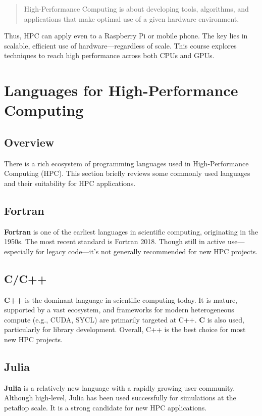 \documentclass[11pt,a4paper]{book}
\begin{document}
\begin{quotation}
High-Performance Computing is about developing tools, algorithms, and applications that make optimal use of a given hardware environment.
\end{quotation}

Thus, HPC can apply even to a Raspberry Pi or mobile phone. The key lies in scalable, efficient use of hardware—regardless of scale. This course explores techniques to reach high performance across both CPUs and GPUs.

\chapter{Languages for High-Performance Computing}

\section*{Overview}
There is a rich ecosystem of programming languages used in High-Performance Computing (HPC). This section briefly reviews some commonly used languages and their suitability for HPC applications.

\section{Fortran}
\textbf{Fortran} is one of the earliest languages in scientific computing, originating in the 1950s. The most recent standard is Fortran 2018. Though still in active use—especially for legacy code—it's not generally recommended for new HPC projects.

\section{C/C++}
\textbf{C++} is the dominant language in scientific computing today. It is mature, supported by a vast ecosystem, and frameworks for modern heterogeneous compute (e.g., CUDA, SYCL) are primarily targeted at C++. \textbf{C} is also used, particularly for library development. Overall, C++ is the best choice for most new HPC projects.

\section{Julia}
\textbf{Julia} is a relatively new language with a rapidly growing user community. Although high-level, Julia has been used successfully for simulations at the petaflop scale. It is a strong candidate for new HPC applications.
\end{document}
